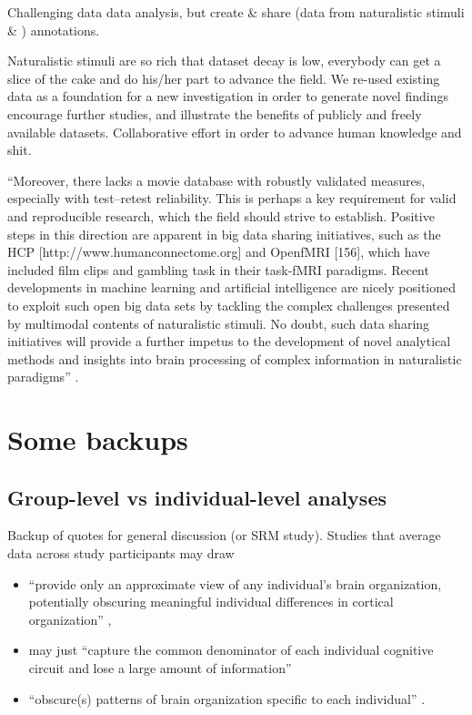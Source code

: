 %
Challenging data data analysis, but create \& share (data from naturalistic
stimuli \& ) annotations.

%
Naturalistic stimuli are so rich that dataset decay is low, everybody can get
a slice of the cake and do his/her part to advance the field.
%
We re-used existing data as a foundation for a new investigation in order to
generate novel findings encourage further studies, and illustrate the benefits
of publicly and freely available datasets.
%
Collaborative effort in order to advance human knowledge and shit.

%
``Moreover, there lacks a movie database with robustly validated measures,
especially with test--retest reliability.
%
This is perhaps a key requirement for valid and reproducible research, which the
field should strive to establish.
%
Positive steps in this direction are apparent in big data sharing initiatives,
such as the HCP [http://www.humanconnectome.org] and OpenfMRI [156], which have
included film clips and gambling task in their task-fMRI paradigms.
%
Recent developments in machine learning and artificial intelligence are nicely
positioned to exploit such open big data sets by tackling the complex challenges
presented by multimodal contents of naturalistic stimuli.
%
No doubt, such data sharing initiatives will provide a further impetus to the
development of novel analytical methods and insights into brain processing of
complex information in naturalistic paradigms''
\citep{sonkusare2019naturalistic}.



\pagebreak


\section{Some backups}


\subsection{Group-level vs individual-level analyses}

Backup of quotes for general discussion (or SRM study).  Studies that average
data across study participants may draw

\begin{itemize}

\item ``provide only an approximate view of any individual's brain organization,
    potentially obscuring meaningful individual differences in cortical
        organization'' \citep{laumann2015functional},

\item may just ``capture the common denominator of each individual cognitive
    circuit and lose a large amount of information''

\item ``obscure(s) patterns of brain organization specific to each individual''
    \citep{laumann2015functional}.

\end{itemize}


